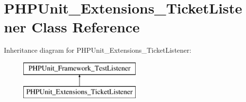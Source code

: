 \hypertarget{class_p_h_p_unit___extensions___ticket_listener}{}\section{P\+H\+P\+Unit\+\_\+\+Extensions\+\_\+\+Ticket\+Listener Class Reference}
\label{class_p_h_p_unit___extensions___ticket_listener}
Inheritance diagram for P\+H\+P\+Unit\+\_\+\+Extensions\+\_\+\+Ticket\+Listener\+:\begin{figure}[H]
\begin{center}
\leavevmode
\includegraphics[height=2.000000cm]{class_p_h_p_unit___extensions___ticket_listener}
\end{center}
\end{figure}
